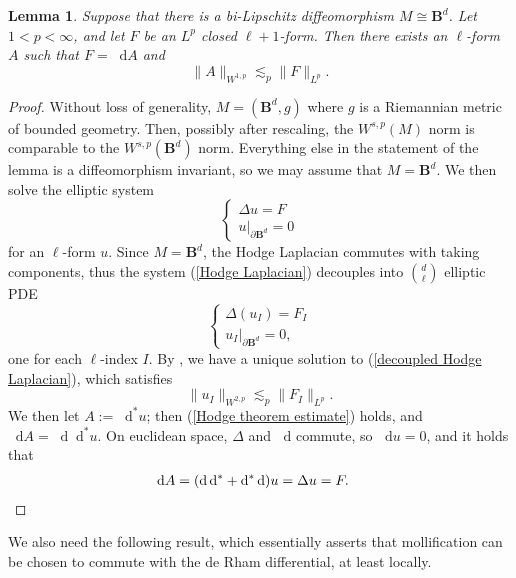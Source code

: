 \documentclass[reqno,11pt]{amsart}
\newcommand{\Ball}{\mathbf{B}}
\newcommand*\dif{\mathop{}\!\mathrm{d}}
\newtheorem{lemma}[theorem]{Lemma}
\theoremstyle{definition}
\numberwithin{equation}{section}
\begin{document}
\begin{lemma}\label{Hodge theorem}
Suppose that there is a bi-Lipschitz diffeomorphism $M \cong \Ball^d$.
Let $1 < p < \infty$, and let $F$ be an $L^p$ closed $\ell + 1$-form.
Then there exists an $\ell$-form $A$ such that $F = \dif A$ and
\begin{equation}\label{Hodge theorem estimate}
\|A\|_{W^{1, p}} \lesssim_p \|F\|_{L^p}.
\end{equation}
\end{lemma}
\begin{proof}
Without loss of generality, $M = (\Ball^d, g)$ where $g$ is a Riemannian metric of bounded geometry.
Then, possibly after rescaling, the $W^{s, p}(M)$ norm is comparable to the $W^{s, p}(\Ball^d)$ norm.
Everything else in the statement of the lemma is a diffeomorphism invariant, so we may assume that $M = \Ball^d$.
We then solve the elliptic system 
\begin{equation}\label{Hodge Laplacian}
\begin{cases}
	\Delta u = F \\
	u|_{\partial \Ball^d} = 0
\end{cases}
\end{equation}
for an $\ell$-form $u$.
Since $M = \Ball^d$, the Hodge Laplacian commutes with taking components, thus the system (\ref{Hodge Laplacian}) decouples into $\binom d\ell$ elliptic PDE
\begin{equation}\label{decoupled Hodge Laplacian}
\begin{cases}
\Delta(u_I) = F_I \\
u_I|_{\partial \Ball^d} = 0,
\end{cases}
\end{equation}
one for each $\ell$-index $I$.
By \cite[Chapter 3, Theorem 6.3]{chen1998second}, we have a unique solution to (\ref{decoupled Hodge Laplacian}), which satisfies
$$\|u_I\|_{W^{2, p}} \lesssim_p \|F_I\|_{L^p}.$$
We then let $A := \dif^* u$; then (\ref{Hodge theorem estimate}) holds, and $\dif A = \dif \dif^* u$.
On euclidean space, $\Delta$ and $\dif$ commute, so $\dif u = 0$, and it holds that 
\begin{align*}
\dif A &= (\dif \dif^* + \dif^* \dif) u = \Delta u = F. \qedhere 
\end{align*}
\end{proof}

We also need the following result, which essentially asserts that mollification can be chosen to commute with the de Rham differential, at least locally.
\end{document}
